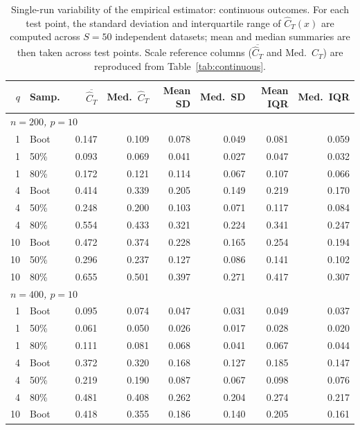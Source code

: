 \documentclass[11pt]{article}
\theoremstyle{plain}
\theoremstyle{definition}
\theoremstyle{remark}
\begin{document}
\newpage
\begin{table}[htbp!]
	\centering
	\footnotesize
	\caption{Single-run variability of the empirical estimator: continuous outcomes. For each test point, the standard deviation and interquartile range of $\widehat C_T(x)$ are computed across $S = 50$ independent datasets; mean and median summaries are then taken across test points. Scale reference columns ($\overline{\widehat C_T}$ and Med.\ $\widehat C_T$) are reproduced from Table~\ref{tab:continuous}.}
	\label{tab:variability_cont}
	\begin{tabular}{rlrrrrrr}
		\hline
		$q$ & Samp.\ & $\overline{\widehat C_T}$ & Med.\ $\widehat C_T$ & Mean SD & Med.\ SD & Mean IQR & Med.\ IQR \\
		\hline
		\multicolumn{8}{l}{\textit{$n = 200$, $p = 10$}} \\[2pt]
		1  & Boot & 0.147 & 0.109 & 0.078 & 0.049 & 0.081 & 0.059 \\
		1  & 50\% & 0.093 & 0.069 & 0.041 & 0.027 & 0.047 & 0.032 \\
		1  & 80\% & 0.172 & 0.121 & 0.114 & 0.067 & 0.107 & 0.066 \\
		4  & Boot & 0.414 & 0.339 & 0.205 & 0.149 & 0.219 & 0.170 \\
		4  & 50\% & 0.248 & 0.200 & 0.103 & 0.071 & 0.117 & 0.084 \\
		4  & 80\% & 0.554 & 0.433 & 0.321 & 0.224 & 0.341 & 0.247 \\
		10 & Boot & 0.472 & 0.374 & 0.228 & 0.165 & 0.254 & 0.194 \\
		10 & 50\% & 0.296 & 0.237 & 0.127 & 0.086 & 0.141 & 0.102 \\
		10 & 80\% & 0.655 & 0.501 & 0.397 & 0.271 & 0.417 & 0.307 \\[4pt]
		\multicolumn{8}{l}{\textit{$n = 400$, $p = 10$}} \\[2pt]
		1  & Boot & 0.095 & 0.074 & 0.047 & 0.031 & 0.049 & 0.037 \\
		1  & 50\% & 0.061 & 0.050 & 0.026 & 0.017 & 0.028 & 0.020 \\
		1  & 80\% & 0.111 & 0.081 & 0.068 & 0.041 & 0.067 & 0.044 \\
		4  & Boot & 0.372 & 0.320 & 0.168 & 0.127 & 0.185 & 0.147 \\
		4  & 50\% & 0.219 & 0.190 & 0.087 & 0.067 & 0.098 & 0.076 \\
		4  & 80\% & 0.481 & 0.408 & 0.262 & 0.204 & 0.274 & 0.217 \\
		10 & Boot & 0.418 & 0.355 & 0.186 & 0.140 & 0.205 & 0.161 \\

\end{tabular}
\end{table}
\end{document}

